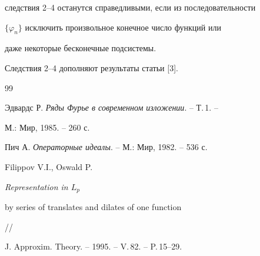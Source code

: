 следствия 2--4 останутся справедливыми, если из последовательности 


$\{\varphi_n\}$ исключить произвольное конечное число функций или  


даже некоторые бесконечные подсистемы. 


\medskip 


 


Следствия 2--4 дополняют результаты статьи [3]. 


 


\begin{thebibliography}{99} 


 




Эдвардс Р. {\em Ряды Фурье в современном изложении}. -- Т.\,1. -- 


М.: Мир, 1985. -- 260 с. 




Пич А. {\em Операторные идеалы}. -- М.: Мир, 1982. -- 536 с. 




Filippov V.I., Oswald P. {\em Representation in $L_p$ 


by series of translates and dilates of one function} // 


J. Approxim. Theory. -- 1995. -- V.\,82. -- P.\,15--29. 


 


\end{thebibliography} 


 


\vskip 2cm 


 






 


\label{end} 


 


